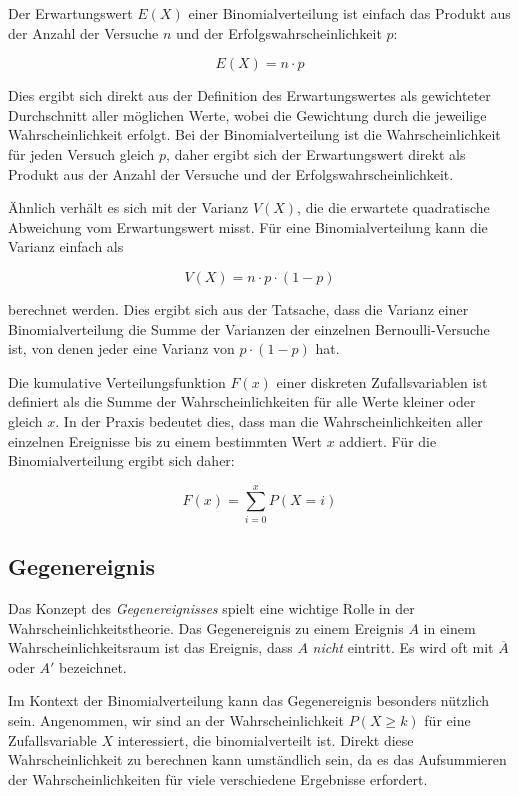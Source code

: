 Der Erwartungswert $E(X)$ einer Binomialverteilung ist einfach das Produkt aus der Anzahl der Versuche $n$ und der Erfolgswahrscheinlichkeit $p$:

\[
    E(X) = n \cdot p
\]

Dies ergibt sich direkt aus der Definition des Erwartungswertes als gewichteter Durchschnitt aller möglichen Werte, wobei die Gewichtung durch die jeweilige Wahrscheinlichkeit erfolgt.
Bei der Binomialverteilung ist die Wahrscheinlichkeit für jeden Versuch gleich $p$, daher ergibt sich der Erwartungswert direkt als Produkt aus der Anzahl der Versuche und der Erfolgswahrscheinlichkeit.

Ähnlich verhält es sich mit der Varianz $V(X)$, die die erwartete quadratische Abweichung vom Erwartungswert misst.
Für eine Binomialverteilung kann die Varianz einfach als

\[
    V(X) = n \cdot p \cdot (1-p)
\]

berechnet werden.
Dies ergibt sich aus der Tatsache, dass die Varianz einer Binomialverteilung die Summe der Varianzen der einzelnen Bernoulli-Versuche ist, von denen jeder eine Varianz von $p \cdot (1-p)$ hat.

Die kumulative Verteilungsfunktion $F(x)$ einer diskreten Zufallsvariablen ist definiert als die Summe der Wahrscheinlichkeiten für alle Werte kleiner oder gleich $x$.
In der Praxis bedeutet dies, dass man die Wahrscheinlichkeiten aller einzelnen Ereignisse bis zu einem bestimmten Wert $x$ addiert.
Für die Binomialverteilung ergibt sich daher:

\[
    F(x) = \sum_{i=0}^{x} P(X=i)
\]

\subsection{Gegenereignis}

Das Konzept des \textit{Gegenereignisses} spielt eine wichtige Rolle in der Wahrscheinlichkeitstheorie.
Das Gegenereignis zu einem Ereignis $A$ in einem Wahrscheinlichkeitsraum ist das Ereignis, dass $A$ \textit{nicht} eintritt.
Es wird oft mit $\overline{A}$ oder $A'$ bezeichnet.

Im Kontext der Binomialverteilung kann das Gegenereignis besonders nützlich sein.
Angenommen, wir sind an der Wahrscheinlichkeit $P(X \geq k)$ für eine Zufallsvariable $X$ interessiert, die binomialverteilt ist.
Direkt diese Wahrscheinlichkeit zu berechnen kann umständlich sein, da es das Aufsummieren der Wahrscheinlichkeiten für viele verschiedene Ergebnisse erfordert.

